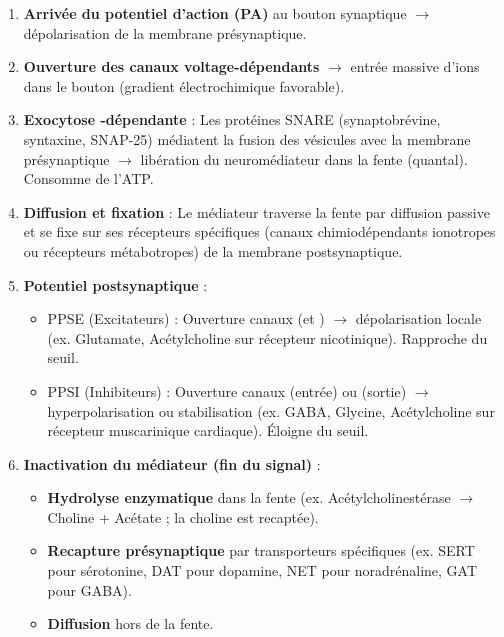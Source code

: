 \documentclass[11pt]{article}
\newcommand{\cle}[1]{{\popxbold\color{popdark}#1}}
\begin{document}
\begin{methode}
\begin{enumerate}
\item \textbf{Arrivée du potentiel d'action (PA)} au bouton synaptique $\rightarrow$ dépolarisation de la membrane présynaptique.
\item \textbf{Ouverture des canaux  voltage-dépendants} $\rightarrow$ entrée massive d'ions  dans le bouton (gradient électrochimique favorable).
\item \textbf{Exocytose -dépendante} : Les protéines SNARE (synaptobrévine, syntaxine, SNAP-25) médiatent la fusion des vésicules avec la membrane présynaptique $\rightarrow$ libération du neuromédiateur dans la fente (quantal). Consomme de l'ATP.
\item \textbf{Diffusion et fixation} : Le médiateur traverse la fente par diffusion passive et se fixe sur ses \cle{récepteurs spécifiques} (canaux chimiodépendants ionotropes ou récepteurs métabotropes) de la membrane postsynaptique.
\item \textbf{Potentiel postsynaptique} :
\begin{itemize}
\item \cle{PPSE} (Excitateurs) : Ouverture canaux  (et ) $\rightarrow$ dépolarisation locale (ex. Glutamate, Acétylcholine sur récepteur nicotinique). Rapproche du seuil.
\item \cle{PPSI} (Inhibiteurs) : Ouverture canaux  (entrée) ou  (sortie) $\rightarrow$ hyperpolarisation ou stabilisation (ex. GABA, Glycine, Acétylcholine sur récepteur muscarinique cardiaque). Éloigne du seuil.
\end{itemize}
\item \textbf{Inactivation du médiateur (fin du signal)} :
\begin{itemize}
\item \textbf{Hydrolyse enzymatique} dans la fente (ex. Acétylcholinestérase $\rightarrow$ Choline + Acétate ; la choline est recaptée).
\item \textbf{Recapture présynaptique} par transporteurs spécifiques (ex. SERT pour sérotonine, DAT pour dopamine, NET pour noradrénaline, GAT pour GABA).
\item \textbf{Diffusion} hors de la fente.
\end{itemize}
\end{enumerate}
\end{methode}
\end{document}
